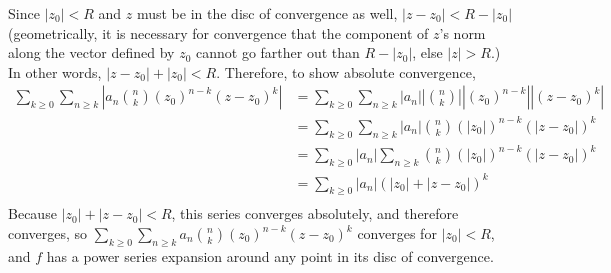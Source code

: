 \documentclass{article}
\begin{document}
Since $|z_0| < R$ and $z$ must be in the disc of convergence as well, $|z - z_0| < R - |z_0|$ (geometrically, it is necessary for convergence that the component of $z$'s norm along the vector defined by $z_0$ cannot go farther out than $R-|z_0|$, else $|z| > R$.) In other words, $|z - z_0| + |z_0|< R$. Therefore, to show absolute convergence, 
\begin{align*}
    \sum\limits_{k\geq 0}\sum\limits_{n \geq k} \left|a_n{n\choose k} (z_0)^{n-k}(z - z_0)^k\right| &= \sum\limits_{k\geq 0}\sum\limits_{n \geq k} |a_n||{n\choose k}|| (z_0)^{n-k}||(z - z_0)^k|\\
    &= \sum\limits_{k\geq 0}\sum\limits_{n \geq k} |a_n|{n\choose k} (|z_0|)^{n-k}(|z - z_0|)^k\\
    &= \sum\limits_{k\geq 0}|a_n|\sum\limits_{n \geq k} {n\choose k} (|z_0|)^{n-k}(|z - z_0|)^k\\
    &= \sum\limits_{k\geq 0}|a_n|(|z_0|+|z - z_0|)^k\\
\end{align*}
Because $|z_0|+|z - z_0| < R$, this series converges absolutely, and therefore converges, so $\sum\limits_{k\geq 0}\sum\limits_{n \geq k} a_n{n\choose k} (z_0)^{n-k}(z - z_0)^k$ converges for $|z_0| < R$, and $f$ has a power series expansion around any point in its disc of convergence.
\end{document}
